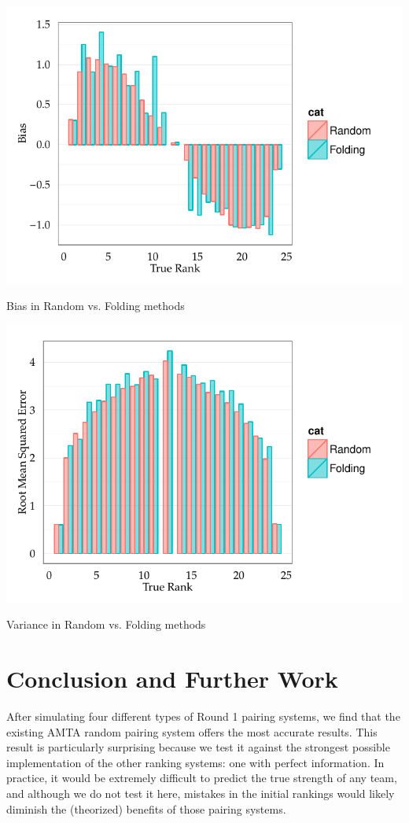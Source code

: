 \documentclass{tufte-handout}
\begin{document}
 
\begin{marginfigure}%
  \includegraphics[width=\linewidth]{bias_ranfold.pdf}
  \caption{Bias in Random vs. Folding methods}
  \label{fig:ranfold_bias}
\end{marginfigure}

\begin{marginfigure}%
  \includegraphics[width=\linewidth]{rmse_ranfold.pdf}
  \caption{Variance in Random vs. Folding methods}
  \label{fig:ranfold_rmse}
\end{marginfigure}

\section{Conclusion and Further Work}
After simulating four different types of Round 1 pairing systems, we find that the existing AMTA random pairing system offers the most accurate results. This result is particularly surprising because we test it against the strongest possible implementation of the other ranking systems: one with perfect information. In practice, it would be extremely difficult to predict the true strength of any team, and although we do not test it here, mistakes in the initial rankings would likely diminish the (theorized) benefits of those pairing systems.
\end{document}
